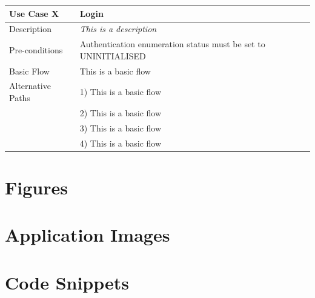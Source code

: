 \documentclass[12pt]{article}
\begin{document}
\begin{subappendices}
	\begin{table}[H]
		\begin{tabular}{ll}
			\hline
			\rowcolor[HTML]{EFEFEF} 
			\textbf{Use Case X}  & \textbf{Login}                                                 \\ \hline
			\rowcolor[HTML]{F5FBFF} 
			Description 		 & \textit{This is a description}                                 \\ \hline
			\rowcolor[HTML]{EFEFEF} 
			Pre-conditions       & Authentication enumeration status must be set to UNINITIALISED \\ \hline
			\rowcolor[HTML]{F5FBFF} 
			Basic Flow           & This is a basic flow                                           \\ \hline
			\rowcolor[HTML]{EFEFEF} 
			Alternative Paths    & 1) This is a basic flow                                        \\
			\rowcolor[HTML]{EFEFEF} 
			& 2) This is a basic flow                                        \\
			\rowcolor[HTML]{EFEFEF} 
			& 3) This is a basic flow                                        \\
			\rowcolor[HTML]{EFEFEF} 
			& 4) This is a basic flow                                       
		\end{tabular}
	\end{table}
	
	\end{subappendices}
	\section{Figures}
	
	\section{Application Images}
	\section{Code Snippets}
	
\end{document}
